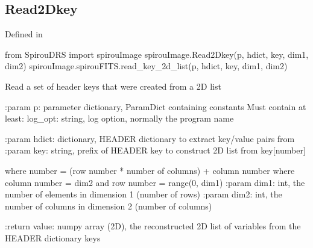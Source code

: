 
\noindent\begin{minipage}{\textwidth}
\subsection{Read2Dkey}

Defined in \spirouImage{}

\begin{pythonbox}
from SpirouDRS import spirouImage
spirouImage.Read2Dkey(p, hdict, key, dim1, dim2)
spirouImage.spirouFITS.read_key_2d_list(p, hdict, key, dim1, dim2)
\end{pythonbox}

\begin{pythondocstring}
Read a set of header keys that were created from a 2D list

:param p: parameter dictionary, ParamDict containing constants
    Must contain at least:
            log_opt: string, log option, normally the program name

:param hdict: dictionary, HEADER dictionary to extract key/value pairs from
:param key: string, prefix of HEADER key to construct 2D list from
             key[number]

             where number = (row number * number of columns) + column number
             where column number = dim2 and row number = range(0, dim1)
:param dim1: int, the number of elements in dimension 1 (number of rows)
:param dim2: int, the number of columns in dimension 2 (number of columns)

:return value: numpy array (2D), the reconstructed 2D list of variables
               from the HEADER dictionary keys
\end{pythondocstring}
\end{minipage}



